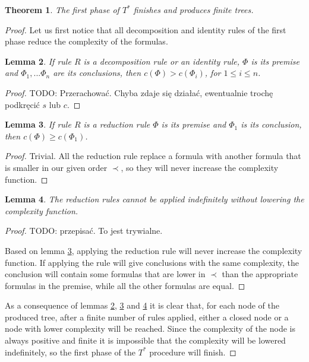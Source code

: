\documentclass{article}
\newtheorem{theorem}{Theorem}
\newtheorem{lemma}[theorem]{Lemma}
\theoremstyle{definition}
\newcommand*{\Ts}{T^*}
\begin{document}
\begin{theorem}
    The first phase of $\Ts$ finishes and produces finite trees.
\end{theorem}
\begin{proof}
    Let us first notice that all decomposition and identity rules of the first phase reduce the complexity of the formulas.

    \begin{lemma}
        \label{l:c}
        If rule $R$ is a decomposition rule or an identity rule, $\Phi$ is its premise and $\Phi_1, ... \Phi_n$ are its conclusions, then $c(\Phi) > c(\Phi_i)$, for $1 \leq i \leq n$.
    \end{lemma}
    \begin{proof}
        TODO: Przerachować. Chyba zdaje się działać, ewentualnie trochę podkręcić $s$ lub $c$.
    \end{proof}
    \begin{lemma}
        \label{l:c2}
        If rule $R$ is a reduction rule $\Phi$ is its premise and $\Phi_1$ is its conclusion, then $c(\Phi) \geq c(\Phi_1)$.
    \end{lemma}
    \begin{proof}
        Trivial. All the reduction rule replace a formula with another formula that is smaller in our given order $\prec$, so they will never increase the complexity function.
    \end{proof}
    \begin{lemma}
        \label{l:c3}
        The reduction rules cannot be applied indefinitely without lowering the complexity function.
    \end{lemma}
    \begin{proof}
        TODO: przepisać. To jest trywialne.

        Based on lemma \cref{l:c2}, applying the reduction rule will never increase the complexity function. If applying the rule will give conclusions with the same complexity, the conclusion will contain some formulas that are lower in $\prec$ than the appropriate formulas in the premise, while all the other formulas are equal.
    \end{proof}

    As a consequence of lemmas \ref{l:c}, \ref{l:c2} and \ref{l:c3} it is clear that, for each node of the produced tree, after a finite number of rules applied, either a closed node or a node with lower complexity will be reached. Since the complexity of the node is always positive and finite it is impossible that the complexity will be lowered indefinitely, so the first phase of the $\Ts$ procedure will finish.

\end{proof}
\end{document}
